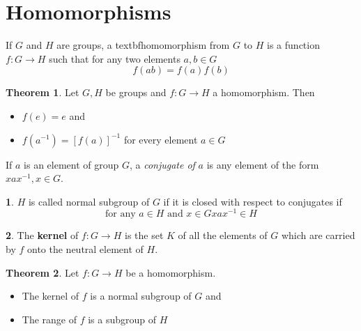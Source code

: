\documentclass[a4paper,12pt]{article}
\theoremstyle{definition}
\newtheorem{definition}{}[section]
\theoremstyle{axiom}
\theoremstyle{theorem}
\newtheorem{theorem}{Theorem}[section]
\theoremstyle{lemma}
\begin{document}
\section{Homomorphisms}
If $G$ and $H$ are groups, a textbf{homomorphism} from $G$ to $H$ is a function $f: G \to H$ such that for any two elements $a,b \in G$ 
\begin{equation*}
    f(ab) = f(a)f(b)
\end{equation*}
\begin{theorem}{}
        Let $G, H$ be groups and $f: G \to H$ a homomorphism. Then
        \begin{itemize}
            \item $f(e) = e$ and
            \item $f(a^{-1}) = [f(a)]^{-1}$ for every element $a \in G$
        \end{itemize}
\end{theorem}
If $a$ is an element of group $G$, a \textit{conjugate of} $a$ is any element of the form $xax^{-1}, x \in G$.
\begin{definition}{}
$H$ is called normal subgroup of $G$ if it is closed with respect to conjugates if
        \begin{equation*}
                \text{for any } a \in H \text{ and } x \in G xax^{-1} \in H
        \end{equation*}
\end{definition}
\begin{definition}{}
        The \textbf{kernel} of $f: G \to H$ is the set $K$ of all the elements of $G$ which are carried by $f$ onto the neutral element of $H$.
\end{definition}
\begin{theorem}{}
        Let $f: G \to H$ be a homomorphism. 
        \begin{itemize}
            \item The kernel of $f$ is a normal subgroup of $G$ and
            \item The range of $f$ is a subgroup of $H$
        \end{itemize}
\end{theorem}
\end{document}
